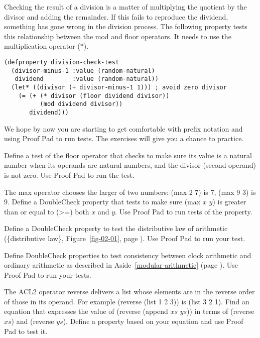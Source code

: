 Checking the result of a division is a matter
of multiplying the quotient by the divisor and adding the remainder.
If this fails to reproduce the dividend,
something has gone wrong in the division process.
The following property tests this relationship
between the \textsf{mod} and \textsf{floor} operators.
It needs to use the multiplication operator ($*$).

\label{division-check-test}
\begin{Verbatim}
(defproperty division-check-test
  (divisor-minus-1 :value (random-natural)
   dividend        :value (random-natural))
  (let* ((divisor (+ divisor-minus-1 1))) ; avoid zero divisor
    (= (+ (* divisor (floor dividend divisor))
          (mod dividend divisor))
       dividend)))
\end{Verbatim}

We hope by now you are starting to get comfortable with prefix notation
and using Proof Pad to run tests.
The exercises will give you a chance to practice.

\begin{ExerciseList}
\Exercise Define a test of the \textsf{floor} operator
that checks to make sure its value is a natural number
when its operands are natural numbers,
and the divisor (second operand) is not zero.
Use Proof Pad to run the test.

\Exercise The
\textsf{max}
operator chooses the larger of two numbers:
\textsf{(max 2 7)} is \textsf{7}, \textsf{(max 9 3)} is \textsf{9}.
Define a DoubleCheck property that tests to make sure
\textsf{(max $x$ $y$)} is
greater
than or equal to (\textsf{>=}) both $x$ and $y$.
Use Proof Pad to run tests of the property.

\Exercise
Define a DoubleCheck property to test the distributive law
of arithmetic (\{distributive law\}, Figure~\ref{fig-02-01}, page \pageref{fig-02-01}).
Use Proof Pad to run your test.

\Exercise
Define DoubleCheck properties to test consistency between clock
arithmetic and ordinary arithmetic as described in
Aside~\ref{modular-arithmetic} (page \pageref{modular-arithmetic}).
Use Proof Pad to run your tests.

\Exercise
The ACL2 operator
\textsf{reverse}
delivers a list whose elements are in the reverse order of those in its operand.
For example \textsf{(reverse (list 1 2 3))} is \textsf{(list 3 2 1)}.
Find an equation that expresses the value of \textsf{(reverse (append $xs$ $ys$))}
in terms of \textsf{(reverse $xs$)} and \textsf{(reverse $ys$)}.
Define a property based on your equation and
use Proof Pad to test it.

\end{ExerciseList}

